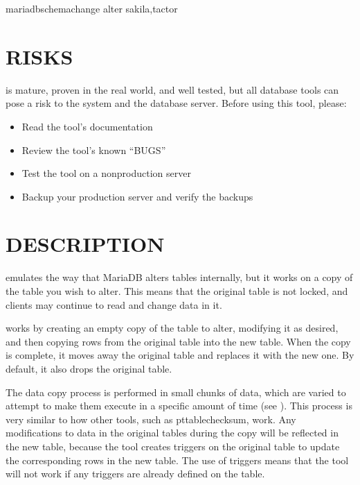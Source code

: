 \documentclass[letterpaper,10pt,english]{sphinxmanual}
\begin{document}
\begin{sphinxVerbatim}[commandchars=\\\{\}]
mariadb\PYGZhy{}schema\PYGZhy{}change \PYGZhy{}\PYGZhy{}alter  sakila,tactor
\end{sphinxVerbatim}


\section{RISKS}
\label{\detokenize{mariadb-schema-change:risks}}
 is mature, proven in the real world, and well tested,
but all database tools can pose a risk to the system and the database
server.  Before using this tool, please:
\begin{itemize}
\item {} 
Read the tool’s documentation

\item {} 
Review the tool’s known “BUGS”

\item {} 
Test the tool on a non\sphinxhyphen{}production server

\item {} 
Backup your production server and verify the backups

\end{itemize}


\section{DESCRIPTION}
\label{\detokenize{mariadb-schema-change:description}}
 emulates the way that MariaDB alters tables internally,
but it works on a copy of the table you wish to alter. This means that the
original table is not locked, and clients may continue to read and change data
in it.

 works by creating an empty copy of the table to alter,
modifying it as desired, and then copying rows from the original table into the
new table. When the copy is complete, it moves away the original table and
replaces it with the new one.  By default, it also drops the original table.

The data copy process is performed in small chunks of data, which are varied to
attempt to make them execute in a specific amount of time (see
{\hyperref[\detokenize{mariadb-schema-change:cmdoption-mariadb-schema-change-chunk-time}]{}}).  This process is very similar to how other tools, such as
pt\sphinxhyphen{}table\sphinxhyphen{}checksum, work.  Any modifications to data in the original tables
during the copy will be reflected in the new table, because the tool creates
triggers on the original table to update the corresponding rows in the new
table.  The use of triggers means that the tool will not work if any triggers
are already defined on the table.
\end{document}
